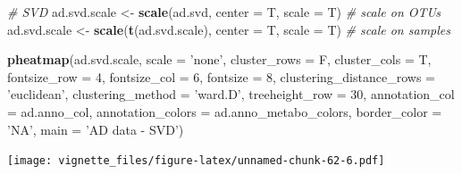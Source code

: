 \documentclass[]{book}
\newenvironment{Shaded}{\begin{snugshade}}{\end{snugshade}}
\newcommand{\KeywordTok}[1]{\textcolor[rgb]{0.13,0.29,0.53}{\textbf{#1}}}
\newcommand{\DataTypeTok}[1]{\textcolor[rgb]{0.13,0.29,0.53}{#1}}
\newcommand{\DecValTok}[1]{\textcolor[rgb]{0.00,0.00,0.81}{#1}}
\newcommand{\StringTok}[1]{\textcolor[rgb]{0.31,0.60,0.02}{#1}}
\newcommand{\CommentTok}[1]{\textcolor[rgb]{0.56,0.35,0.01}{\textit{#1}}}
\newcommand{\NormalTok}[1]{#1}
\begin{document}
\begin{Shaded}
\begin{Highlighting}[]
\CommentTok{# SVD}
\NormalTok{ad.svd.scale <-}\StringTok{ }\KeywordTok{scale}\NormalTok{(ad.svd, }\DataTypeTok{center =}\NormalTok{ T, }\DataTypeTok{scale =}\NormalTok{ T) }\CommentTok{# scale on OTUs}
\NormalTok{ad.svd.scale <-}\StringTok{ }\KeywordTok{scale}\NormalTok{(}\KeywordTok{t}\NormalTok{(ad.svd.scale), }\DataTypeTok{center =}\NormalTok{ T, }\DataTypeTok{scale =}\NormalTok{ T) }\CommentTok{# scale on samples}

\KeywordTok{pheatmap}\NormalTok{(ad.svd.scale, }
         \DataTypeTok{scale =} \StringTok{'none'}\NormalTok{, }
         \DataTypeTok{cluster_rows =}\NormalTok{ F, }
         \DataTypeTok{cluster_cols =}\NormalTok{ T, }
         \DataTypeTok{fontsize_row =} \DecValTok{4}\NormalTok{, }\DataTypeTok{fontsize_col =} \DecValTok{6}\NormalTok{,}
         \DataTypeTok{fontsize =} \DecValTok{8}\NormalTok{,}
         \DataTypeTok{clustering_distance_rows =} \StringTok{'euclidean'}\NormalTok{,}
         \DataTypeTok{clustering_method =} \StringTok{'ward.D'}\NormalTok{,}
         \DataTypeTok{treeheight_row =} \DecValTok{30}\NormalTok{,}
         \DataTypeTok{annotation_col =}\NormalTok{ ad.anno_col,}
         \DataTypeTok{annotation_colors =}\NormalTok{ ad.anno_metabo_colors,}
         \DataTypeTok{border_color =} \StringTok{'NA'}\NormalTok{,}
         \DataTypeTok{main =} \StringTok{'AD data - SVD'}\NormalTok{)}
\end{Highlighting}
\end{Shaded}

\texttt{[image: vignette\_files/figure-latex/unnamed-chunk-62-6.pdf]}
\end{document}
